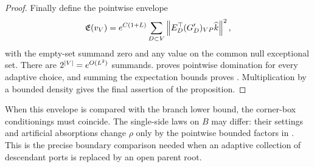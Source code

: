 \begin{proof}
Finally define the pointwise envelope
\[
 \mathfrak E(v_V)=e^{C(1+L)}
   \sum_{D\subset V}
    \left\lVert E_D^\top(G_D')_{VP}\widehat k\right\rVert^2,
\]
with the empty-set summand zero and any value on the common null
exceptional set. There are $2^{\left\lvert V\right\rvert}=e^{O(L^2)}$ summands.
 proves pointwise domination for
every adaptive choice, and summing the expectation bounds proves
. Multiplication by a bounded density
gives the final assertion of the proposition.
\end{proof}

When this envelope is compared with the branch lower bound, the
corner-box conditionings must coincide. The single-side laws on
$B$ may differ: their settings and artificial absorptions change
$\rho$ only by the pointwise bounded factors in .
This is the precise boundary comparison needed when an adaptive
collection of descendant ports is replaced by an open parent root.
